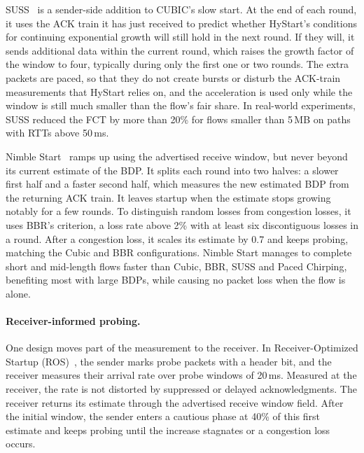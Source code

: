 SUSS~\cite{arghavani2024suss} is a sender-side addition to CUBIC's slow
start. At the end of each round, it uses the ACK train it has just received to
predict whether HyStart's conditions for continuing exponential growth will still
hold in the next round. If they will, it sends additional data within the current
round, which raises the growth factor of the window to four, typically during only
the first one or two rounds. The extra packets are paced, so that they do not create
bursts or disturb the ACK-train measurements that HyStart relies on, and the
acceleration is used only while the window is still much smaller than the flow's
fair share. In real-world experiments, SUSS reduced the FCT by more than 20\% for
flows smaller than 5\,MB on paths with RTTs above 50\,ms.


Nimble Start~\cite{nimblestart} ramps up using the advertised receive window, but never
beyond its current estimate of the BDP. It splits each round into two halves: a slower
first half and a faster second half, which measures the new estimated BDP from the returning ACK train. It leaves startup
when the estimate stops growing notably for a few rounds. To distinguish random losses from congestion
losses, it uses BBR's criterion, a loss rate above 2\% with at least six discontiguous
losses in a round. After a congestion loss, it scales its estimate by 0.7 and keeps
probing, matching the Cubic and BBR configurations. Nimble Start manages to complete short and mid-length flows faster than Cubic, BBR, SUSS and Paced Chirping, benefiting most with large BDPs, while causing no packet loss when the flow is alone.

\paragraph{Receiver-informed probing.} One design moves part of the
measurement to the receiver. In Receiver-Optimized Startup (ROS)~\cite{ros}, the sender
marks probe packets with a header bit, and the receiver measures their arrival rate
over probe windows of 20\,ms. Measured at
the receiver, the rate is not distorted by suppressed or delayed acknowledgments. The
receiver returns its estimate through the advertised receive window field. After
the initial window, the sender enters a cautious phase at 40\% of this first estimate
and keeps probing until the increase stagnates or a congestion loss occurs.

